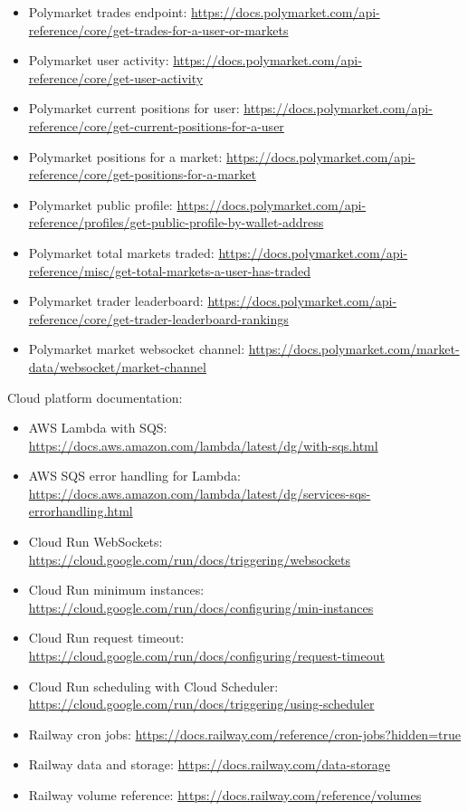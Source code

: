 \documentclass[
]{article}
\providecommand{\tightlist}{%
  \setlength{\itemsep}{0pt}\setlength{\parskip}{0pt}}
\begin{document}
\begin{itemize}
\tightlist
\item
  Polymarket trades endpoint:
  \url{https://docs.polymarket.com/api-reference/core/get-trades-for-a-user-or-markets}
\item
  Polymarket user activity:
  \url{https://docs.polymarket.com/api-reference/core/get-user-activity}
\item
  Polymarket current positions for user:
  \url{https://docs.polymarket.com/api-reference/core/get-current-positions-for-a-user}
\item
  Polymarket positions for a market:
  \url{https://docs.polymarket.com/api-reference/core/get-positions-for-a-market}
\item
  Polymarket public profile:
  \url{https://docs.polymarket.com/api-reference/profiles/get-public-profile-by-wallet-address}
\item
  Polymarket total markets traded:
  \url{https://docs.polymarket.com/api-reference/misc/get-total-markets-a-user-has-traded}
\item
  Polymarket trader leaderboard:
  \url{https://docs.polymarket.com/api-reference/core/get-trader-leaderboard-rankings}
\item
  Polymarket market websocket channel:
  \url{https://docs.polymarket.com/market-data/websocket/market-channel}
\end{itemize}

Cloud platform documentation:

\begin{itemize}
\tightlist
\item
  AWS Lambda with SQS:
  \url{https://docs.aws.amazon.com/lambda/latest/dg/with-sqs.html}
\item
  AWS SQS error handling for Lambda:
  \url{https://docs.aws.amazon.com/lambda/latest/dg/services-sqs-errorhandling.html}
\item
  Cloud Run WebSockets:
  \url{https://cloud.google.com/run/docs/triggering/websockets}
\item
  Cloud Run minimum instances:
  \url{https://cloud.google.com/run/docs/configuring/min-instances}
\item
  Cloud Run request timeout:
  \url{https://cloud.google.com/run/docs/configuring/request-timeout}
\item
  Cloud Run scheduling with Cloud Scheduler:
  \url{https://cloud.google.com/run/docs/triggering/using-scheduler}
\item
  Railway cron jobs:
  \url{https://docs.railway.com/reference/cron-jobs?hidden=true}
\item
  Railway data and storage: \url{https://docs.railway.com/data-storage}
\item
  Railway volume reference:
  \url{https://docs.railway.com/reference/volumes}
\end{itemize}
\end{document}

